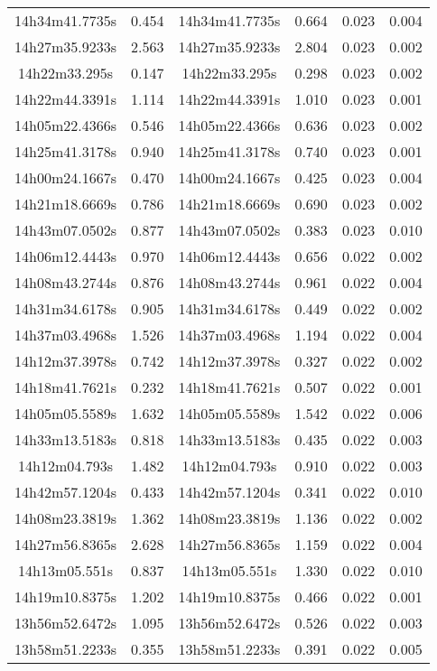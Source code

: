\begin{table}
\begin{tabular}{cccccc}
14h34m41.7735s & 0.454 & 14h34m41.7735s & 0.664 & 0.023 & 0.004 \\
14h27m35.9233s & 2.563 & 14h27m35.9233s & 2.804 & 0.023 & 0.002 \\
14h22m33.295s & 0.147 & 14h22m33.295s & 0.298 & 0.023 & 0.002 \\
14h22m44.3391s & 1.114 & 14h22m44.3391s & 1.010 & 0.023 & 0.001 \\
14h05m22.4366s & 0.546 & 14h05m22.4366s & 0.636 & 0.023 & 0.002 \\
14h25m41.3178s & 0.940 & 14h25m41.3178s & 0.740 & 0.023 & 0.001 \\
14h00m24.1667s & 0.470 & 14h00m24.1667s & 0.425 & 0.023 & 0.004 \\
14h21m18.6669s & 0.786 & 14h21m18.6669s & 0.690 & 0.023 & 0.002 \\
14h43m07.0502s & 0.877 & 14h43m07.0502s & 0.383 & 0.023 & 0.010 \\
14h06m12.4443s & 0.970 & 14h06m12.4443s & 0.656 & 0.022 & 0.002 \\
14h08m43.2744s & 0.876 & 14h08m43.2744s & 0.961 & 0.022 & 0.004 \\
14h31m34.6178s & 0.905 & 14h31m34.6178s & 0.449 & 0.022 & 0.002 \\
14h37m03.4968s & 1.526 & 14h37m03.4968s & 1.194 & 0.022 & 0.004 \\
14h12m37.3978s & 0.742 & 14h12m37.3978s & 0.327 & 0.022 & 0.002 \\
14h18m41.7621s & 0.232 & 14h18m41.7621s & 0.507 & 0.022 & 0.001 \\
14h05m05.5589s & 1.632 & 14h05m05.5589s & 1.542 & 0.022 & 0.006 \\
14h33m13.5183s & 0.818 & 14h33m13.5183s & 0.435 & 0.022 & 0.003 \\
14h12m04.793s & 1.482 & 14h12m04.793s & 0.910 & 0.022 & 0.003 \\
14h42m57.1204s & 0.433 & 14h42m57.1204s & 0.341 & 0.022 & 0.010 \\
14h08m23.3819s & 1.362 & 14h08m23.3819s & 1.136 & 0.022 & 0.002 \\
14h27m56.8365s & 2.628 & 14h27m56.8365s & 1.159 & 0.022 & 0.004 \\
14h13m05.551s & 0.837 & 14h13m05.551s & 1.330 & 0.022 & 0.010 \\
14h19m10.8375s & 1.202 & 14h19m10.8375s & 0.466 & 0.022 & 0.001 \\
13h56m52.6472s & 1.095 & 13h56m52.6472s & 0.526 & 0.022 & 0.003 \\
13h58m51.2233s & 0.355 & 13h58m51.2233s & 0.391 & 0.022 & 0.005 \\

\end{tabular}
\end{table}
